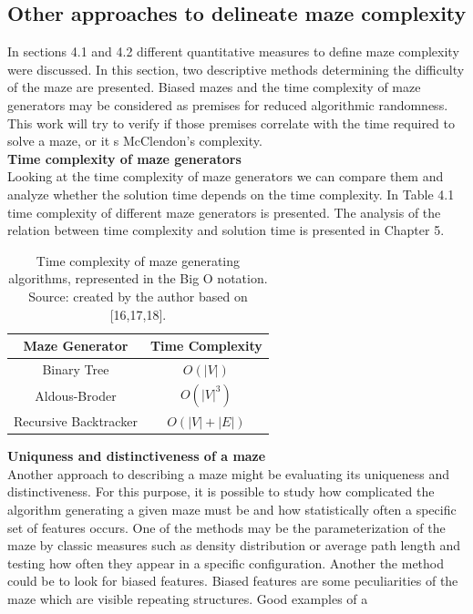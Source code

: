 \subsection{Other approaches to delineate maze complexity }
In sections 4.1 and 4.2 different quantitative measures to define maze complexity were discussed. In this section, two descriptive methods determining the difficulty of the maze are presented. Biased mazes and the time complexity of maze generators may be considered as premises for reduced algorithmic randomness. This work will try to verify if those premises correlate with the time required to solve a maze, or it s McClendon’s complexity.\\ \newline
\textbf{Time complexity of maze generators}\\
Looking at the time complexity of maze generators we can compare them and analyze whether the solution time depends on the time complexity. In Table 4.1 time complexity of different maze generators is presented. The analysis of the relation between time complexity and solution time is presented in Chapter 5.\\
\begin{table}[!ht]
\centering
\begin{tabular}{ |c||c| } 
\hline 
Maze Generator& Time Complexity\\ \hline
Binary Tree\cite{16} & $O(|V|)$\\
Aldous-Broder\cite{17}& $O(|V|^3)$\\ 
Recursive Backtracker\cite{18}& $O(|V|+|E|)$\\ 
\hline
 \end{tabular} 
\caption{Time complexity of maze generating algorithms, represented in the Big O notation.\\Source: created by the author based on [16,17,18].} 
 \end{table}
\newpage
\textbf{Uniquness and distinctiveness of a maze}\\
Another approach to describing a maze might be evaluating its uniqueness and distinctiveness. For this purpose, it is possible to study how complicated the
algorithm generating a given maze must be and how statistically often a specific set of features occurs. One of the methods may be the parameterization of
the maze by classic measures such as density distribution or average path length and testing how often they appear in a specific configuration. Another
the method could be to look for biased features. Biased features are some peculiarities of the maze which are visible repeating structures. Good examples of a
